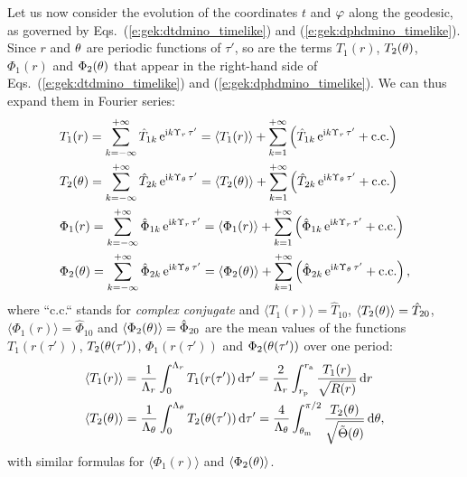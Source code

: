 Let us now consider the evolution of the coordinates $t$ and $\varphi$ along the
geodesic, as governed
by Eqs.~(\ref{e:gek:dtdmino_timelike}) and (\ref{e:gek:dphdmino_timelike}).
Since $r$ and $\theta$ are periodic functions of $\tau'$, so are the terms
$T_1(r)$, $T_2(\theta)$, $\Phi_1(r)$ and $\Phi_2(\theta)$ that appear in the right-hand side
of Eqs.~(\ref{e:gek:dtdmino_timelike}) and (\ref{e:gek:dphdmino_timelike}). We can thus expand them in Fourier series:
\begin{subequations}
\begin{align}
  &  T_1(r) = \sum_{k=-\infty}^{+\infty} \hat{T}_{1k} \, \mathrm{e}^{\mathrm{i} k \Upsilon_r \, \tau'} = \langle T_1(r) \rangle + \sum_{k=1}^{+\infty} \left( \hat{T}_{1k} \, \mathrm{e}^{\mathrm{i} k \Upsilon_r \, \tau'} + \mathrm{c.c.} \right) \\
  &  T_2(\theta) = \sum_{k=-\infty}^{+\infty} \hat{T}_{2k} \, \mathrm{e}^{\mathrm{i} k \Upsilon_\theta \, \tau'} = \langle T_2(\theta) \rangle + \sum_{k=1}^{+\infty} \left( \hat{T}_{2k} \, \mathrm{e}^{\mathrm{i} k \Upsilon_\theta \, \tau'} + \mathrm{c.c.} \right) \\
  &  \Phi_1(r) = \sum_{k=-\infty}^{+\infty} \hat{\Phi}_{1k} \, \mathrm{e}^{\mathrm{i} k \Upsilon_r \, \tau'} = \langle \Phi_1(r) \rangle + \sum_{k=1}^{+\infty} \left( \hat{\Phi}_{1k} \, \mathrm{e}^{\mathrm{i} k \Upsilon_r \, \tau'} + \mathrm{c.c.} \right) \\
  &  \Phi_2(\theta) = \sum_{k=-\infty}^{+\infty} \hat{\Phi}_{2k} \, \mathrm{e}^{\mathrm{i} k \Upsilon_\theta \, \tau'} = \langle \Phi_2(\theta) \rangle + \sum_{k=1}^{+\infty} \left( \hat{\Phi}_{2k} \, \mathrm{e}^{\mathrm{i} k \Upsilon_\theta \, \tau'} + \mathrm{c.c.} \right) ,
\end{align}
\end{subequations}
where ``c.c.`` stands for \emph{complex conjugate} and $\langle T_1(r) \rangle = \hat{T}_{10}$, $\langle T_2(\theta) \rangle = \hat{T}_{20}$,
$\langle \Phi_1(r) \rangle = \hat{\Phi}_{10}$ and $\langle \Phi_2(\theta) \rangle = \hat{\Phi}_{20}$
are the mean values of the functions $T_1(r(\tau'))$,
$T_2(\theta(\tau'))$, $\Phi_1(r(\tau'))$ and $\Phi_2(\theta(\tau'))$ over one period:
\begin{subequations}
\begin{align}
    & \langle T_1(r) \rangle = \frac{1}{\Lambda_r} \int_{0}^{\Lambda_r}
        T_1(r(\tau'))\, \mathrm{d} \tau'
        = \frac{2}{\Lambda_r} \int_{r_{\rm p}}^{r_{\rm a}} \frac{T_1(r)}{\sqrt{R(r)}}\, \mathrm{d} r \\
    & \langle T_2(\theta) \rangle = \frac{1}{\Lambda_\theta} \int_{0}^{\Lambda_\theta}
        T_2(\theta(\tau'))\, \mathrm{d} \tau'
        = \frac{4}{\Lambda_\theta} \int_{\theta_{\rm m}}^{\pi/2}
            \frac{T_2(\theta)}{\sqrt{\tilde\Theta(\theta)}}\, \mathrm{d} \theta ,
\end{align}
\end{subequations}
with similar formulas for $\langle \Phi_1(r) \rangle$ and $\langle \Phi_2(\theta) \rangle$.

